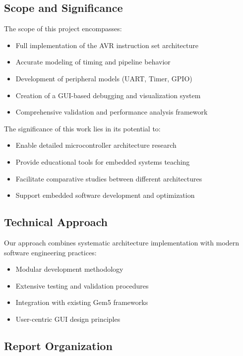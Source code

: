 \subsection{Scope and Significance}
The scope of this project encompasses:
\begin{itemize}
    \item Full implementation of the AVR instruction set architecture
    \item Accurate modeling of timing and pipeline behavior
    \item Development of peripheral models (UART, Timer, GPIO)
    \item Creation of a GUI-based debugging and visualization system
    \item Comprehensive validation and performance analysis framework
\end{itemize}

The significance of this work lies in its potential to:

\begin{itemize}
    \item Enable detailed microcontroller architecture research
    \item Provide educational tools for embedded systems teaching
    \item Facilitate comparative studies between different architectures
    \item Support embedded software development and optimization
\end{itemize}

\subsection{Technical Approach}

Our approach combines systematic architecture implementation with modern software engineering practices:
\begin{itemize}
    \item Modular development methodology
    \item Extensive testing and validation procedures
    \item Integration with existing Gem5 frameworks
    \item User-centric GUI design principles
\end{itemize}

\subsection{Report Organization}

